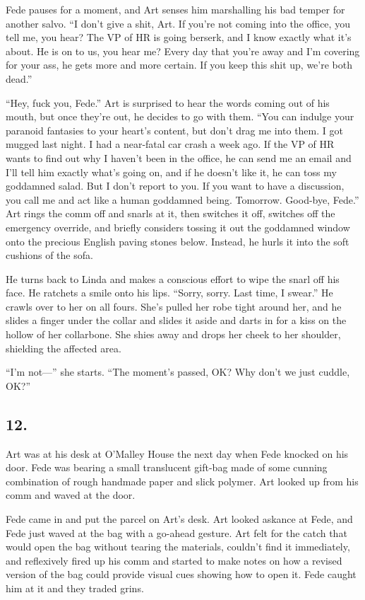 Fede pauses for a moment, and Art senses him marshalling his bad
temper for another salvo. “I don’t give a shit, Art. If you’re not
coming into the office, you tell me, you hear? The VP of HR is
going berserk, and I know exactly what it’s about. He is on to us,
you hear me? Every day that you’re away and I’m covering for your
ass, he gets more and more certain. If you keep this shit up, we’re
both dead.”

“Hey, fuck you, Fede.” Art is surprised to hear the words coming
out of his mouth, but once they’re out, he decides to go with them.
“You can indulge your paranoid fantasies to your heart’s content,
but don’t drag me into them. I got mugged last night. I had a
near-fatal car crash a week ago. If the VP of HR wants to find out
why I haven’t been in the office, he can send me an email and I’ll
tell him exactly what’s going on, and if he doesn’t like it, he can
toss my goddamned salad. But I don’t report to you. If you want to
have a discussion, you call me and act like a human goddamned
being. Tomorrow. Good-bye, Fede.” Art rings the comm off and snarls
at it, then switches it off, switches off the emergency override,
and briefly considers tossing it out the goddamned window onto the
precious English paving stones below. Instead, he hurls it into the
soft cushions of the sofa.

He turns back to Linda and makes a conscious effort to wipe the
snarl off his face. He ratchets a smile onto his lips. “Sorry,
sorry. Last time, I swear.” He crawls over to her on all fours.
She’s pulled her robe tight around her, and he slides a finger
under the collar and slides it aside and darts in for a kiss on the
hollow of her collarbone. She shies away and drops her cheek to her
shoulder, shielding the affected area.

“I’m not—” she starts. “The moment’s passed, OK? Why don’t we just
cuddle, OK?”

\subsection{12.}

Art was at his desk at O’Malley House the next day when Fede
knocked on his door. Fede was bearing a small translucent gift-bag
made of some cunning combination of rough handmade paper and slick
polymer. Art looked up from his comm and waved at the door.

Fede came in and put the parcel on Art’s desk. Art looked askance
at Fede, and Fede just waved at the bag with a go-ahead gesture.
Art felt for the catch that would open the bag without tearing the
materials, couldn’t find it immediately, and reflexively fired up
his comm and started to make notes on how a revised version of the
bag could provide visual cues showing how to open it. Fede caught
him at it and they traded grins.

